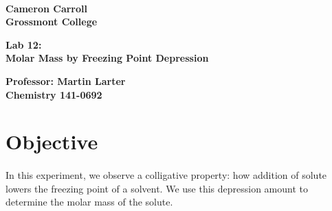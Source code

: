 \documentclass[fleqn,titlepage]{article}
\begin{document}
\begin{titlepage}
  \mbox{}\\[1.25cm]
  \textbf{\LARGE Cameron Carroll \\ Grossmont College}\\[2.25cm]
  \begin{center}
    \textbf{\huge Lab 12: \\ Molar Mass by Freezing Point Depression}\\[2.50cm]
  \end{center}
  \textbf{\LARGE Professor: Martin Larter \\ Chemistry 141-0692} \\
  \vfill
\end{titlepage}

\section*{Objective}
  \paragraph{} In this experiment, we observe a colligative property: how addition of solute lowers the freezing point of a solvent. We use this depression amount to determine the molar mass of the solute.

\end{document}
